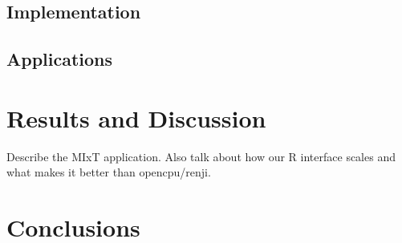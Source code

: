 \subsection*{Implementation}

\subsection*{Applications}




\section*{Results and Discussion}
Describe the MIxT application. Also talk about how our R interface scales and
what makes it better than opencpu/renji.


\section*{Conclusions}
